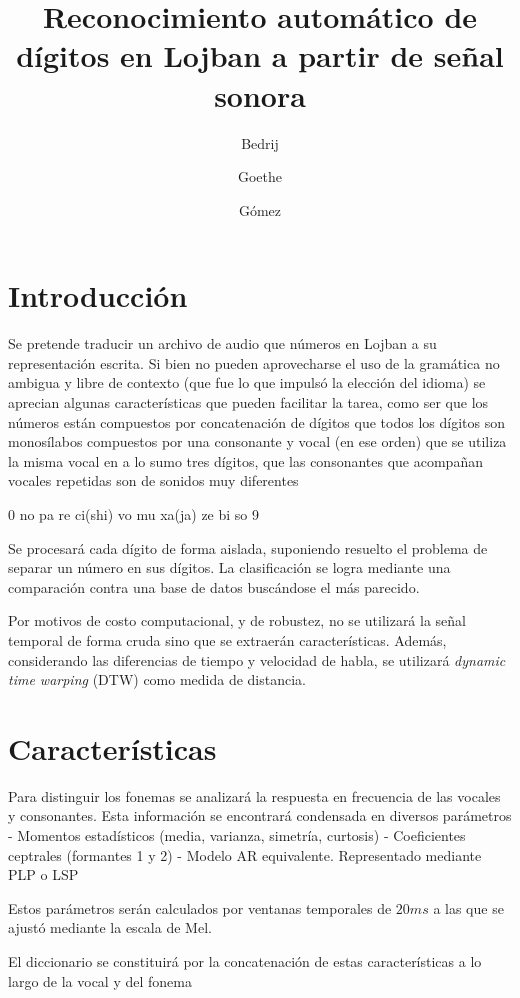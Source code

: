 \documentclass[a4paper]{article}
\title{Reconocimiento automático de dígitos en Lojban a partir de señal sonora}
\author{Bedrij \and Goethe \and Gómez}
\date{}
\begin{document}
	\maketitle
	\section{Introducción}
	Se pretende traducir un archivo de audio que números en Lojban a su representación escrita.
	Si bien no pueden aprovecharse el uso de la gramática no ambigua y libre de contexto
	(que fue lo que impulsó la elección del idioma)
	se aprecian algunas características que pueden facilitar la tarea, como ser
	que los números están compuestos por concatenación de dígitos
	que todos los dígitos son monosílabos compuestos por una consonante y vocal (en ese orden)
	que se utiliza la misma vocal en a lo sumo tres dígitos, 
	que las consonantes que acompañan vocales repetidas son de sonidos muy diferentes

	0 no pa re ci(shi) vo
	mu xa(ja) ze bi so 9

	Se procesará cada dígito de forma aislada, suponiendo resuelto el problema de separar un número en sus dígitos.
	La clasificación se logra mediante una comparación contra una base de datos buscándose el más parecido.
	
	Por motivos de costo computacional, y de robustez, no se utilizará la señal temporal de forma cruda sino que se extraerán características.
	Además, considerando las diferencias de tiempo y velocidad de habla, se utilizará \emph{dynamic time warping} (DTW) como medida de distancia.

	\section{Características}
		Para distinguir los fonemas se analizará la respuesta en frecuencia de las vocales y consonantes.
		Esta información se encontrará condensada en diversos parámetros
			- Momentos estadísticos (media, varianza, simetría, curtosis)
			- Coeficientes ceptrales (formantes 1 y 2)
			- Modelo AR equivalente. Representado mediante PLP o LSP

		Estos parámetros serán calculados por ventanas temporales de $20ms$ a las que se ajustó mediante la escala de Mel.

		El diccionario se constituirá por la concatenación de estas características a lo largo de la vocal y del fonema
\end{document}
